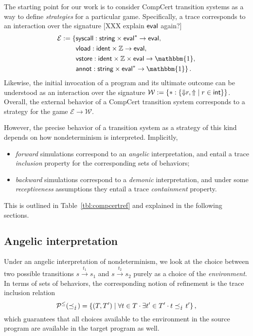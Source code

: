 \documentclass[acmsmall,review,anonymous]{acmart}\settopmatter{printfolios=true,printccs=false,printacmref=false}
\newcommand{\bdot}{\cdot}
\begin{document}
The starting point for our work
is to consider CompCert transition systems
as a way to define \emph{strategies}
for a particular game.
Specifically,
a trace corresponds to an interaction
over the signature
[XXX explain $ \mathsf{eval} $ again?]
\begin{align*}
  \mathcal{E} := \{ {}
    &\kw{syscall} :
      \kw{string} \times \kw{eval}^* \rightarrow \kw{eval},
      \\
    &\kw{vload} :
      \kw{ident} \times \mathbb{Z} \rightarrow \kw{eval},
      \\
    &\kw{vstore} :
      \kw{ident} \times \mathbb{Z} \times \kw{eval} \rightarrow \mathbbm{1},
      \\
    &\kw{annot} :
      \kw{string} \times \kw{eval}^* \rightarrow \mathbbm{1}
  \}
  \,.
\end{align*}
Likewise,
the initial invocation of a program
and its ultimate outcome can
be understood as an interaction over the signature
$
  \mathcal{W} := \{
    {*} : \{ {\Downarrow} r, {\Uparrow} \mid r \in  \mathsf{int}  \}
  \}
$.
Overall,
the external behavior of
a CompCert transition system
corresponds to a strategy
for the game $\mathcal{E} \rightarrow \mathcal{W}$.

However,
the precise behavior of a transition system
as a strategy of this kind
depends on how nondeterminism is interpreted.
Implicitly,
\begin{itemize}
  \item
    \emph{forward} simulations
    correspond to an \emph{angelic} interpretation,
    and entail a trace \emph{inclusion} property
    for the corresponding sets of behaviors;
  \item
    \emph{backward} simulations
    correspond to a \emph{demonic} interpretation, and
    under some \emph{receptiveness} assumptions
    they entail a trace \emph{containment} property.
\end{itemize}
This is outlined in Table~\ref{tbl:compcertref}
and explained in the following sections.


\subsection{Angelic interpretation} \label{sec:sem:fsim} %

Under an angelic interpretation of nondeterminism,
we look at the choice between two possible transitions
$
  s \stackrel{t_1}{\longrightarrow} s_1
$
and
$
  s \stackrel{t_2}{\longrightarrow} s_2
$
purely as a choice of the \emph{environment}.
In terms of sets of behaviors,
the corresponding notion of refinement
is the trace inclusion relation
\[
  \mathcal{P}^\le({\refby_\lightning}) =
  \{ (T, T') \mid \forall t \in T \bdot \exists t' \in T' \bdot
      t \refby_\lightning t' \}
  \,,
\]
which guarantees that
all choices available to the environment in the source program
are available in the target program as well.
\end{document}

